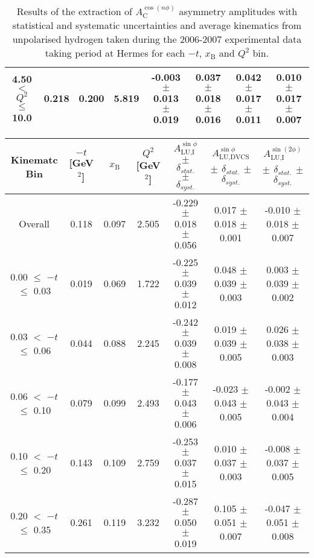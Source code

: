 \begin{table}[width=15cm]
\begin{center}
{\begin{tabular}{|c|c|c|c|c|c|c|c|}
4.50 $<$ $Q^{2}$ $\leqslant$ 10.0 &  0.218 & 0.200 &  5.819 &  -0.003  $\pm$  0.013  $\pm$   0.019 & 
0.037  $\pm$  0.018  $\pm$  0.016 & 0.042 $\pm$   0.017  $\pm$  0.011 & 0.010   $\pm$  0.017   $\pm$   0.007\\
\hline
  \end{tabular}
}
 \end{center}
\caption{Results of the extraction of $A_{\textrm{C}}^{\cos(n\phi)}$ asymmetry amplitudes with statistical and systematic uncertainties and average kinematics from unpolarised hydrogen taken during
the 2006-2007 experimental data taking period at H{\sc ermes} for each $-t$, $x_{\textrm{B}}$ and $Q^{2}$ bin.}
\end{table}


\begin{table}[width=15cm]
 \begin{center}
\resizebox{16cm}{!} {
  \begin{tabular}{|c|c|c|c|c|c|c|}
\hline
Kinematc Bin &  $-t$ [GeV$^{2}$] & $x_{\textrm{B}}$ & $Q^{2}$ [GeV$^{2}$] & 
$A_{\textrm{LU,I}}^{\sin\phi}$ $\pm$ $\delta_{stat.}$ $\pm$ $\delta_{syst.}$ & $A_{\textrm{LU,DVCS}}^{\sin\phi}$ $\pm$ $\delta_{stat.}$ $\pm$ $\delta_{syst.}$
& $A_{\textrm{LU,I}}^{\sin(2\phi)}$ $\pm$ $\delta_{stat.}$ $\pm$ $\delta_{syst.}$ \\
\hline
\hline
Overall &  0.118 & 0.097 &  2.505 &  -0.229  $\pm$  0.018  $\pm$   0.056 &
 0.017  $\pm$  0.018  $\pm$  0.001 & -0.010  $\pm$  0.018  $\pm$   0.007 \\
\hline
0.00 $\leqslant$ $-t$ $\leqslant$ 0.03 &  0.019 & 0.069 &  1.722 &  -0.225  $\pm$  0.039 $\pm$   0.012 &
 0.048  $\pm$  0.039   $\pm$  0.003 & 0.003  $\pm$  0.039  $\pm$   0.002\\
0.03 $<$ $-t$ $\leqslant$ 0.06 &  0.044 & 0.088 &  2.245 &  -0.242 $\pm$   0.039   $\pm$  0.008 &
 0.019 $\pm$   0.039  $\pm$   0.005 & 0.026  $\pm$  0.038  $\pm$   0.003\\
0.06 $<$ $-t$ $\leqslant$ 0.10 &  0.079 & 0.099 &  2.493 & -0.177 $\pm$   0.043   $\pm$  0.006 &
 -0.023  $\pm$  0.043  $\pm$   0.005 & -0.002  $\pm$  0.043   $\pm$  0.004 \\
0.10 $<$ $-t$ $\leqslant$ 0.20 &  0.143 & 0.109 &  2.759 &  -0.253 $\pm$   0.037  $\pm$   0.015 &
0.010  $\pm$  0.037  $\pm$   0.003 & -0.008  $\pm$  0.037  $\pm$  0.005\\
0.20 $<$ $-t$ $\leqslant$ 0.35 &  0.261 & 0.119 &  3.232 &  -0.287 $\pm$   0.050  $\pm$   0.019 &
0.105  $\pm$  0.051  $\pm$   0.007 & -0.047 $\pm$   0.051   $\pm$  0.008\\

\end{tabular}}
\end{center}
\end{table}
